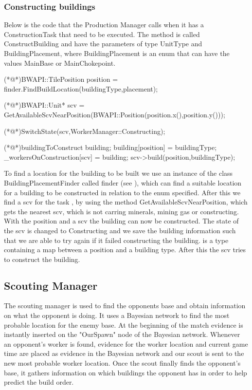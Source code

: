 		\subsubsection*{Constructing buildings}
			Below is the code that the Production Manager calls when it has a ConstructionTask that need to be executed. The method is called 
			ConstructBuilding and have the parameters of type UnitType and BuildingPlacement, where BuildingPlacement 
			is an enum that can have the values MainBase or MainChokepoint.
			\begin{Sourcecode}[caption=ConstructBuilding method]		
	(*@\lnote@*)BWAPI::TilePosition position = finder.FindBuildLocation(buildingType,placement);

	(*@\lnote@*)BWAPI::Unit* scv = GetAvailableScvNearPosition(BWAPI::Position(position.x(),position.y()));
	

	(*@\lnote@*)SwitchState(scv,WorkerManager::Constructing);
	
	(*@\lnote@*)buildingToConstruct building;	
	building[position] = buildingType;
	_workersOnConstruction[scv] = building;
	scv->build(position,buildingType);
			\end{Sourcecode}
			
			To find a location for the building to be built we use an instance of the class BuildingPlacementFinder called finder (see ), 
			which can find a suitable location for a building to be constructed in relation to the enum specified. After this we find a scv for the 
			task , by using the method GetAvailableScvNearPosition, which gets the nearest scv, which is not carring minerals, mining gas or 
			constructing. With the position and a scv the building can now be constructed. The state of the scv is changed to Constructing  and 
			we save the building information such that we are able to try again if it failed constructing the building.  is a type containing 
			a map between a position and a building type. After this the scv tries to 
			construct the building.
	\subsection{Scouting Manager}
		The scouting manager is used to find the opponents base and obtain information on what the opponent is doing. 
		It uses a Bayesian network to find the most probable location for the enemy base.
		At the beginning of the match evidence is instantly inserted on the "OurSpawn" node of the Bayesian network.
		Whenever an opponent's worker is found, evidence for the worker location and current game time are placed as evidence in the 
		Bayesian network and our scout is sent to the new most probable worker location. 
		Once the scout finally finds the opponent's base, it gathers information on which 
		buildings the opponent has in order to help predict the build order.
